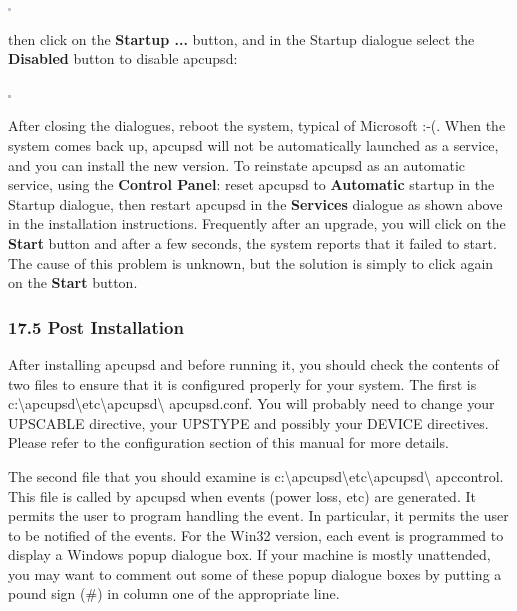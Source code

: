 {{{{{{{{{{
\includegraphics{./wininstall6.eps}  

then click on the {\bf Startup ...} button, and in the Startup dialogue select
the {\bf Disabled} button to disable apcupsd:  

\includegraphics{./wininstall7.eps}  

After closing the dialogues, reboot the system, typical of Microsoft :-(. When
the system comes back up, apcupsd will not be automatically launched as a
service, and you can install the new version. To reinstate apcupsd as an
automatic service, using the {\bf Control Panel}: reset apcupsd to {\bf
Automatic} startup in the Startup dialogue, then restart apcupsd in the {\bf
Services} dialogue as shown above in the installation instructions. Frequently
after an upgrade, you will click on the {\bf Start} button and after a few
seconds, the system reports that it failed to start. The cause of this problem
is unknown, but the solution is simply to click again on the {\bf Start}
button. 

\label{Post-Installation}

\subsubsection*{17.5 Post Installation}

\label{index-Windows_002c-Post-Installation-177}
After installing apcupsd and before running it, you should check the contents
of two files to ensure that it is configured properly for your system. The
first is
c:\textbackslash{}apcupsd\textbackslash{}etc\textbackslash{}apcupsd\textbackslash
{}apcupsd.conf. You will probably need to change your UPSCABLE directive, your
UPSTYPE and possibly your DEVICE directives. Please refer to the configuration
section of this manual for more details.  

The second file that you should examine is
c:\textbackslash{}apcupsd\textbackslash{}etc\textbackslash{}apcupsd\textbackslash
{}apccontrol. This file is called by apcupsd when events (power loss, etc) are
generated. It permits the user to program handling the event. In particular,
it permits the user to be notified of the events. For the Win32 version, each
event is programmed to display a Windows popup dialogue box. If your machine
is mostly unattended, you may want to comment out some of these popup dialogue
boxes by putting a pound sign (\#) in column one of the appropriate line. 

}}}}}}}}}}
